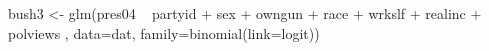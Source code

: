 \begin{Schunk}
\begin{Sinput}
  bush3 <- glm(pres04 ~ partyid + sex + owngun + race + wrkslf + realinc + polviews , data=dat, family=binomial(link=logit))
\end{Sinput}
\end{Schunk}
